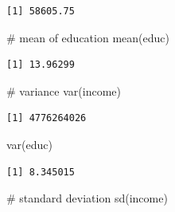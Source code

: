 \documentclass[
  letterpaper,
  DIV=11,
  numbers=noendperiod]{scrreprt}
\newenvironment{Shaded}{\begin{snugshade}}{\end{snugshade}}
\newcommand{\CommentTok}[1]{\textcolor[rgb]{0.37,0.37,0.37}{#1}}
\newcommand{\FunctionTok}[1]{\textcolor[rgb]{0.28,0.35,0.67}{#1}}
\newcommand{\NormalTok}[1]{\textcolor[rgb]{0.00,0.23,0.31}{#1}}
\newcommand{\OtherTok}[1]{\textcolor[rgb]{0.00,0.23,0.31}{#1}}
\newcommand{\SpecialCharTok}[1]{\textcolor[rgb]{0.37,0.37,0.37}{#1}}
\begin{document}
\begin{Shaded}
\end{Shaded}

\begin{verbatim}
[1] 58605.75
\end{verbatim}

\begin{Shaded}
\begin{Highlighting}[]
\CommentTok{\# mean of education}
\FunctionTok{mean}\NormalTok{(educ)}
\end{Highlighting}
\end{Shaded}

\begin{verbatim}
[1] 13.96299
\end{verbatim}

\begin{Shaded}
\begin{Highlighting}[]
\CommentTok{\# variance}
\FunctionTok{var}\NormalTok{(income)}
\end{Highlighting}
\end{Shaded}

\begin{verbatim}
[1] 4776264026
\end{verbatim}

\begin{Shaded}
\begin{Highlighting}[]
\FunctionTok{var}\NormalTok{(educ)}
\end{Highlighting}
\end{Shaded}

\begin{verbatim}
[1] 8.345015
\end{verbatim}

\begin{Shaded}
\begin{Highlighting}[]
\CommentTok{\# standard deviation}
\FunctionTok{sd}\NormalTok{(income)}
\end{Highlighting}
\end{Shaded}
\end{document}
